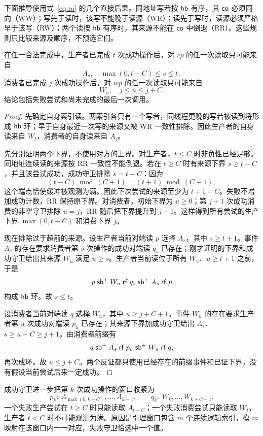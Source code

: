 下面推导使用式~\eqref{eq:ra} 的几个直接后果。同地址写若按 $\mathsf{hb}$ 有序，其 $\mathsf{co}$ 必须同向（WW）；写先于读时，该写不能晚于读源（WR）；读先于写时，读源必须严格早于该写（RW）；两个读按 $\mathsf{hb}$ 有序时，其来源不能在 $\mathsf{co}$ 中倒退（RR）。这些规则只比较来源及顺序，不预选它们。

\begin{lemma}[全部尝试的来源窗口]\label{lem:bufferwindow}
在任一合法完成中，生产者已完成 $t$ 次成功操作后，对 $rp$ 的任一次读取只可能来自
\[
 A_s,\quad \max(0,t-C)\le s\le t;
\]
消费者已完成 $j$ 次成功操作后，对 $wp$ 的任一次读取只可能来自
\[
 W_u,\quad j\le u\le j+C.
\]
结论包括失败尝试和尚未完成的最后一次调用。
\end{lemma}
\begin{proof}
先确定自身索引读。两索引各只有一个写者，同线程更晚的写若被读到将形成 $\mathsf{hb}$ 环；早于自身最近一次写的来源又被 WR 一致性排除。因此生产者的自身读来自 $W_t$，消费者的自身读来自 $A_j$。

先分别证明两个下界，不使用对方的上界。对生产者，$t\le C$ 时非负性已经足够。同地址连续读的来源按 RR 一致性不能倒退。若在 $t\ge C$ 时有来源下界 $s\ge t-C$，并且该尝试成功，成功守卫排除 $s=t-C$：因为
\[
 (t-C)\bmod(C+1)=(t+1)\bmod(C+1),
\]
这个端点恰使缓冲被观测为满。因此下次尝试的来源至少为 $t+1-C$。失败不增加成功计数，RR 保持原下界。对消费者，初始下界为 $u\ge0$；第 $j+1$ 次成功消费的非空守卫排除 $u=j$，RR 随后把下界提升到 $j+1$。这样得到所有尝试的生产下界 $\max(0,t-C)$ 和消费下界 $j$。

现在排除过于超前的来源。设生产者当前对端读 $p$ 选择 $A_s$，其中 $s\ge t+1$。事件 $A_s$ 的存在要求消费者第 $s$ 次操作的成功对端读 $q_s$ 已存在；刚才证明的下界和成功守卫给出其来源 $W_u$ 满足 $u\ge s$。生产者当前读位于所有 $W_u$、$u\ge t+1$ 之前，于是
\[
 p\mathrel{\mathsf{sb}^+}W_u\mathrel{\mathsf{rf}}q_s
   \mathrel{\mathsf{sb}^+}A_s\mathrel{\mathsf{rf}}p
\]
构成 $\mathsf{hb}$ 环。故 $s\le t$。

设消费者当前对端读 $q$ 选择 $W_u$，其中 $u\ge j+C+1$。事件 $W_u$ 的存在要求生产者第 $u$ 次成功对端读 $p_u$ 已存在；其来源下界加成功守卫给出 $A_s$、$s\ge u-C\ge j+1$。由消费者前缀有
\[
 q\mathrel{\mathsf{sb}^+}A_s\mathrel{\mathsf{rf}}p_u
   \mathrel{\mathsf{sb}^+}W_u\mathrel{\mathsf{rf}}q,
\]
再次成环。故 $u\le j+C$。两个反证都只使用已经存在的前缀事件和已证下界，没有假设当前尝试后来一定成功。\qedhere
\end{proof}

成功守卫进一步把第 $k$ 次成功操作的窗口收紧为
\begin{equation}\label{eq:successwindow}
 p_k:\ A_{\max(0,k-C)},\ldots,A_{k-1},
 \qquad
 q_k:\ W_k,\ldots,W_{k+C-1}.
\end{equation}
一个失败生产尝试在 $t\ge C$ 时只能读取 $A_{t-C}$；一个失败消费尝试只能读取 $W_j$。生产者 $t<C$ 时不可能观测为满。原因是引理窗口包含 $m$ 个连续逻辑索引，模 $m$ 映射在该窗口内一一对应，失败守卫恰选中一个值。

